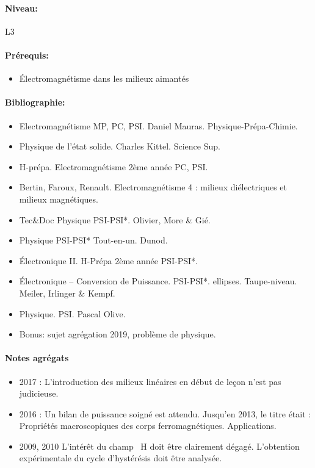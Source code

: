 \documentclass[11pt]{report}
\numberwithin{figure}{section}
\numberwithin{equation}{section}
\numberwithin{table}{section}
\newcommand{\1}{\boldsymbol{1}}
\begin{document}
\paragraph*{Niveau:} L3

\paragraph*{Prérequis:} 
\begin{itemize}
\item Électromagnétisme dans les milieux aimantés
\end{itemize}

\paragraph*{Bibliographie:}
\begin{itemize}
\item Electromagnétisme MP, PC, PSI. Daniel Mauras. Physique-Prépa-Chimie.
\item Physique de l'état solide. Charles Kittel. Science Sup.
\item H-prépa. Electromagnétisme 2ème année PC, PSI.
\item Bertin, Faroux, Renault. Electromagnétisme 4 : milieux diélectriques et milieux magnétiques.
\item Tec\&Doc Physique PSI-PSI*. Olivier, More \& Gié.
\item Physique PSI-PSI* Tout-en-un. Dunod.
\item Électronique II. H-Prépa 2ème année PSI-PSI*.
\item Électronique -- Conversion de Puissance. PSI-PSI*. ellipses. Taupe-niveau. Meiler, Irlinger \& Kempf.
\item Physique. PSI. Pascal Olive. 
\item Bonus: sujet agrégation 2019, problème de physique.
\end{itemize}

\paragraph{Notes agrégats}
\begin{itemize}
\item 2017 : L’introduction des milieux linéaires en début de leçon n’est pas judicieuse.
\item 2016 : Un bilan de puissance soigné est attendu.
Jusqu’en 2013, le titre était : Propriétés macroscopiques des corps ferromagnétiques. Applications.
\item 2009, 2010 L’intérêt du champ ~H doit être clairement dégagé. L’obtention expérimentale
du cycle d’hystérésis doit être analysée.
\end{itemize}
\end{document}
